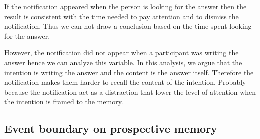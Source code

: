 If the notification appeared when the person is looking for the answer then the result
is consistent with the time needed to pay attention and to dismiss the notification.
Thus we can not draw a conclusion based on the time spent looking for the answer.

However, the notification did not appear when a participant was writing the answer hence we can analyze this variable.
In this analysis, we argue that the intention is writing the answer and the content
is the answer itself. Therefore the notification makes them harder to recall the content of the intention.
Probably because the notification act as a distraction that lower the level of attention when the intention is framed to the memory.

%


\subsection{Event boundary on prospective memory}
